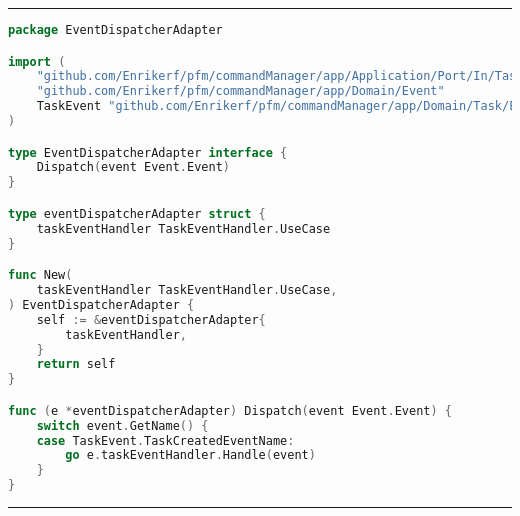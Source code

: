 
\phantom{blank}
\vspace{5mm}
\hrule
\begin{lstlisting}[language=Go,caption={DispatcherAdapter.go},breaklines=true,label={lst:DispatcherAdapter}]
package EventDispatcherAdapter

import (
	"github.com/Enrikerf/pfm/commandManager/app/Application/Port/In/Task/TaskEventHandler"
	"github.com/Enrikerf/pfm/commandManager/app/Domain/Event"
	TaskEvent "github.com/Enrikerf/pfm/commandManager/app/Domain/Task/Event"
)

type EventDispatcherAdapter interface {
	Dispatch(event Event.Event)
}

type eventDispatcherAdapter struct {
	taskEventHandler TaskEventHandler.UseCase
}

func New(
	taskEventHandler TaskEventHandler.UseCase,
) EventDispatcherAdapter {
	self := &eventDispatcherAdapter{
		taskEventHandler,
	}
	return self
}

func (e *eventDispatcherAdapter) Dispatch(event Event.Event) {
	switch event.GetName() {
	case TaskEvent.TaskCreatedEventName:
		go e.taskEventHandler.Handle(event)
	}
}


\end{lstlisting}
\hrule